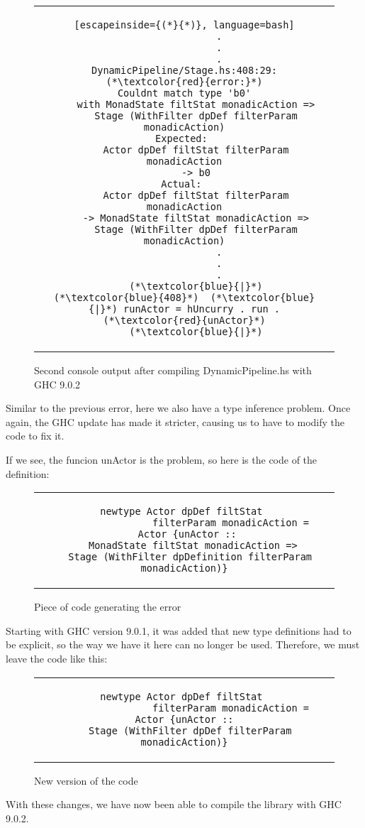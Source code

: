 \begin{figure}[H]
    \begin{tabular}{c}
        \begin{lstlisting}[escapeinside={(*}{*)}, language=bash]
            .
            .
            .
DynamicPipeline/Stage.hs:408:29: (*\textcolor{red}{error:}*)
Couldnt match type 'b0'
    with MonadState filtStat monadicAction =>
    Stage (WithFilter dpDef filterParam monadicAction)
Expected: 
    Actor dpDef filtStat filterParam monadicAction
    -> b0
Actual: 
    Actor dpDef filtStat filterParam monadicAction
    -> MonadState filtStat monadicAction =>
    Stage (WithFilter dpDef filterParam monadicAction)
            .
            .
            .
    (*\textcolor{blue}{|}*)
(*\textcolor{blue}{408}*)  (*\textcolor{blue}{|}*) runActor = hUncurry . run . (*\textcolor{red}{unActor}*)
    (*\textcolor{blue}{|}*)
        \end{lstlisting}
    \end{tabular}
    \caption[{[Lib] Second console output}]{Second console output after compiling DynamicPipeline.hs with GHC 9.0.2}
    \label{fig:HC28}
\end{figure}

Similar to the previous error, here we also have a type inference problem.
Once again, the GHC update has made it stricter, causing us to have to modify the code to fix it.

If we see, the funcion unActor is the problem, so here is the code of the definition:

\begin{figure}[H]
    \begin{tabular}{c}
        \begin{lstlisting}
newtype Actor dpDef filtStat 
                filterParam monadicAction =
  Actor {unActor :: 
    MonadState filtStat monadicAction => 
  Stage (WithFilter dpDefinition filterParam monadicAction)}
        \end{lstlisting}
    \end{tabular}
    \caption[{[Code]} unActor error]{Piece of code generating the error}
    \label{fig:HC29}
\end{figure}

Starting with GHC version 9.0.1, it was added that new type definitions had to be explicit, so the way we have it here can no longer be used.
Therefore, we must leave the code like this:
\begin{figure}[H]
    \begin{tabular}{c}
        \begin{lstlisting}
newtype Actor dpDef filtStat 
                filterParam monadicAction =
Actor {unActor ::
  Stage (WithFilter dpDef filterParam monadicAction)}
        \end{lstlisting}
    \end{tabular}
    \caption[{[Code]} New unActor]{New version of the code}
    \label{fig:HC30}
\end{figure}
With these changes, we have now been able to compile the library with GHC 9.0.2.


